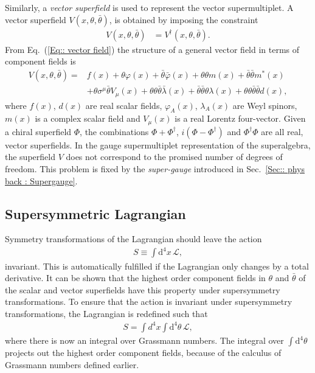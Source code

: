 \documentclass[twoside,english]{uiofysmaster}
\begin{document}
Similarly, a \textit{vector superfield} is used to represent the vector supermultiplet. A vector superfield  $V(x, \theta, \bar{\theta})$, is obtained by imposing the constraint
\begin{align}
V (x, \theta, \bar{\theta}) &= V^{\dagger} (x, \theta, \bar{\theta}).\label{Eq:: vector field}
\end{align}
From Eq.\ (\ref{Eq:: vector field}) the structure of a general vector field in terms of component fields is \cite{martin2010supersymmetry}
\begin{align}
V (x, \theta, \bar{\theta}) =& f(x) + \theta \varphi (x) + \bar{\theta} \bar{\varphi} (x) + \theta \theta m(x) + \bar{\theta} \bar{\theta} m^* (x) \nonumber \\
&+ \theta \sigma^{\mu} \bar{\theta} V_{\mu} (x) + \theta \theta \bar{\theta} \bar{\lambda} (x) + \bar{\theta} \bar{\theta} \theta \lambda (x) + \theta \theta \bar{\theta} \bar{\theta} d(x),
\end{align}
where $f(x)$, $d(x)$ are real scalar fields, $\varphi_A (x)$, $\lambda_A (x)$ are Weyl spinors, $m(x)$ is a complex scalar field and $V_{\mu} (x)$ is a real Lorentz four-vector. Given a chiral superfield $\Phi$, the combinations $\Phi + \Phi^{\dagger}$, $i (\Phi - \Phi^{\dagger})$ and $\Phi^{\dagger} \Phi$ are all real, vector superfields. In the gauge supermultiplet representation of the superalgebra, the superfield $V$ does not correspond to the promised number of degrees of freedom. This problem is fixed by the \textit{super-gauge} introduced in Sec.~\ref{Sec:: phys back : Supergauge}. 



\subsection{Supersymmetric Lagrangian}

Symmetry transformations of the Lagrangian should leave the action
\begin{align}
S \equiv \int \mathrm{d}^4x \, \mathcal{L},
\end{align}
 invariant. This is automatically fulfilled if the Lagrangian only changes by a total derivative. It can be shown that the highest order component fields in $\theta$ and $\bar{\theta}$ of the scalar and vector superfields have this property under supersymmetry transformations. To ensure that the action is invariant under supersymmetry transformations, the Lagrangian is redefined such that
\begin{align}
S = \int d^4x \int \mathrm{d}^4 \theta \, \mathcal{L},
\end{align}
where there is now an integral over Grassmann numbers. The integral over $\int \mathrm{d}^4 \theta$ projects out the highest order component fields, because of the calculus of Grassmann numbers defined earlier.
\end{document}
